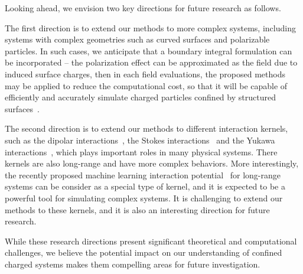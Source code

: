Looking ahead, we envision two key directions for future research as follows.

The first direction is to extend our methods to more complex systems, including systems with complex geometries such as curved surfaces and polarizable particles.
In such cases, we anticipate that a boundary integral formulation can be incorporated -- the polarization effect can be approximated as the field due to induced surface charges, then in each field evaluations, the proposed methods may be applied to reduce the computational cost, so that it will be capable of efficiently and accurately simulate charged particles confined by structured surfaces~\cite{wu2018asymmetric}.

The second direction is to extend our methods to different interaction kernels, such as the dipolar interactions~\cite{Messina2017PRL}, the Stokes interactions~\cite{barnett2018unified} and the Yukawa interactions~\cite{Hou2009PRL}, which plays important roles in many physical systems.
There kernels are also long-range and have more complex behaviors.
More interestingly, the recently proposed machine learning interaction potential~\cite{cheng2025latent, ji2025machinelearninginteratomicpotentialslongrange} for long-range systems can be consider as a special type of kernel, and it is expected to be a powerful tool for simulating complex systems.
It is challenging to extend our methods to these kernels, and it is also an interesting direction for future research.

While these research directions present significant theoretical and computational challenges, we believe the potential impact on our understanding of confined charged systems makes them compelling areas for future investigation.